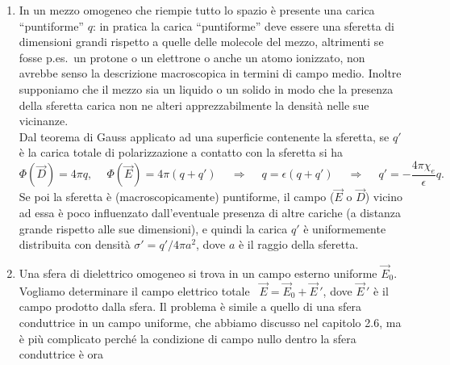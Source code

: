 \begin{enumerate}
\begin{equation}
      \qquad\sigma'=-\frac{\epsilon-1}{\epsilon}\sigma
      =-\frac{4\pi\chi_e}{\epsilon}\sigma
      \tag{14.45}
    \end{equation}
    in accordo con la (14.44). Quindi se $\sigma>0$, $\sigma'<0$.\\
    La capacit\`a del condensatore, se $S$ \`e l'area delle armature
    ($d\ll\sqrt S$), \`e
    \begin{equation}
      C\equiv\frac{Q}{V}=\frac{\sigma S}{V}
      =\frac{\epsilon S}{4\pi\big(\epsilon d-(\epsilon-1)s\big)}\,\cdot
      \tag{14.46}
    \end{equation}
    Se il dielettrico riempie tutto il condensatore ($s=d$), ritroviamo la
    (14.1) \ $C=\epsilon\,C_0$.
  \item In un mezzo omogeneo che riempie tutto lo spazio \`e presente una carica
    ``puntiforme'' $q$: in pratica la carica ``puntiforme'' deve essere una
    sferetta di dimensioni grandi rispetto a quelle delle molecole del mezzo,
    altrimenti se fosse p.es.\ un protone o un elettrone o anche un atomo
    ionizzato, non avrebbe senso la descrizione macroscopica in termini di campo
    medio. Inoltre supponiamo che il mezzo sia un liquido o un solido in modo
    che la presenza della sferetta carica non ne alteri apprezzabilmente la
    densit\`a nelle sue vicinanze.\\
    Dal teorema di Gauss applicato ad una superficie contenente la sferetta, se
    $q'$ \`e la carica totale di polarizzazione a contatto con la sferetta si ha
    \[
      \Phi(\vec D)=4\pi q,
      \quad\ \Phi(\vec E)=4\pi(q+q')\quad\ \Rightarrow\quad\ q=\epsilon(q+q')
      \quad\ \Rightarrow\quad\ q'=-\frac{4\pi\chi_e}{\epsilon}q.
    \]
    Se poi la sferetta \`e (macroscopicamente) puntiforme, il campo ($\vec E$ o
    $\vec D$) vicino ad essa \`e poco influenzato dall'eventuale presenza di
    altre cariche (a distanza grande rispetto alle sue dimensioni), e quindi la
    carica $q'$ \`e uniformemente distribuita con densit\`a
    $\sigma'=q'/4\pi a^2$, dove $a$ \`e il raggio della sferetta.
  \item Una sfera di dielettrico omogeneo si trova in un campo esterno uniforme
    $\vec E_0$. Vogliamo determinare il campo elettrico totale
    \ $\vec E=\vec E_0+\vec E\,'$, dove $\vec E\,'$ \`e il campo prodotto dalla
    sfera.
    Il problema \`e simile a quello di una sfera conduttrice in un campo
    uniforme, che abbiamo discusso nel capitolo 2.6, ma \`e pi\`u complicato
    perch\'e la condizione di campo nullo dentro la sfera conduttrice \`e ora

\end{enumerate}
